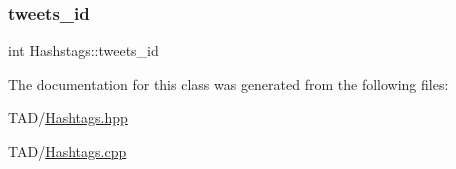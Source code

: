 \mbox{\label{class_hashstags_af1cf690e31ce16188b5b6de7a72c3cfc}} 
\subsubsection{\texorpdfstring{tweets\+\_\+id}{tweets\_id}}
{\footnotesize\ttfamily int Hashstags\+::tweets\+\_\+id\hspace{0.3cm}{\ttfamily [private]}}



The documentation for this class was generated from the following files\+:\begin{DoxyCompactItemize}
\item 
T\+A\+D/\hyperlink{_hashtags_8hpp}{Hashtags.\+hpp}\item 
T\+A\+D/\hyperlink{_hashtags_8cpp}{Hashtags.\+cpp}\end{DoxyCompactItemize}
